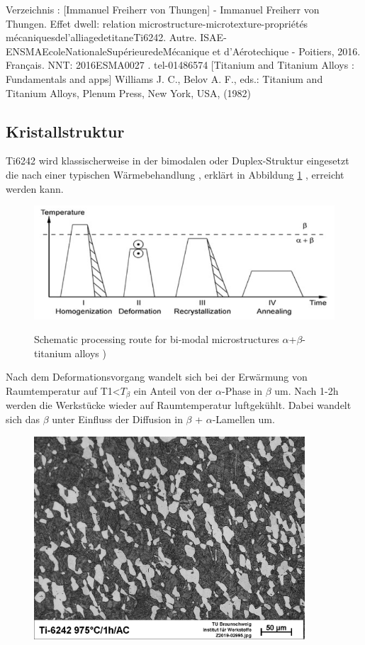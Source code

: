 Verzeichnis : [Immanuel Freiherr von Thungen] - Immanuel Freiherr von Thungen. Effet dwell: relation microstructure-microtexture-propriétés mécaniquesdel’alliagedetitaneTi6242. Autre. ISAE-ENSMAEcoleNationaleSupérieuredeMécanique et d’Aérotechique - Poitiers, 2016. Français. NNT: 2016ESMA0027 .  tel-01486574
[Titanium and Titanium Alloys : Fundamentals and apps] Williams J. C., Belov A. F., eds.: Titanium and Titanium Alloys, Plenum Press, New York, USA, (1982) 


\subsection{Kristallstruktur}

Ti6242 wird klassischerweise in der bimodalen oder Duplex-Struktur eingesetzt die nach einer typischen Wärmebehandlung , erklärt in Abbildung \ref{WB} , erreicht  werden kann.

\begin{figure}[H]
	
	\centering
	
	{\includegraphics[width=1\textwidth]{Bilder/WB}}			
	\caption{Schematic processing route for bi-modal microstructures $\alpha$+$\beta$-titanium alloys )}
	\label{WB}
\end{figure}
Nach dem Deformationsvorgang wandelt sich bei der Erwärmung von Raumtemperatur  auf \hspace{1ex} T1<$T_{\beta}$  ein Anteil von der $\alpha$-Phase in $\beta$ um. Nach 1-2h werden die Werkstücke wieder auf Raumtemperatur luftgekühlt.
Dabei wandelt sich das $\beta$ unter Einfluss der Diffusion in $\beta$ + $\alpha$-Lamellen um.

\begin{figure}[H]
	\centering
	\includegraphics[width=0.9\textwidth]{Bilder/LM-975-1h-AC}
	\caption{}
	\label{L.M}
\end{figure}


